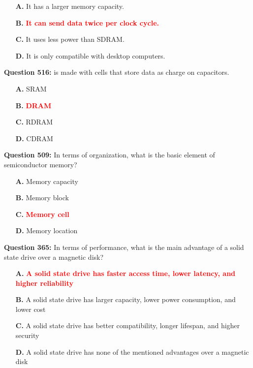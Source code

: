 \documentclass[12pt,a4paper]{article}
\begin{document}
\begin{itemize}
    \item[\textbf{A.}] It has a larger memory capacity.
    \item[\textbf{B.}] \textcolor{red}{\textbf{It can send data twice per clock cycle.}}
    \item[\textbf{C.}] It uses less power than SDRAM.
    \item[\textbf{D.}] It is only compatible with desktop computers.
\end{itemize}

\vspace{0.5cm}

\vspace{0.5cm}

\textbf{Question 516:} \underline{\hspace{1.5cm}} is made with cells that store data as charge on capacitors.

\begin{itemize}
    \item[\textbf{A.}] SRAM
    \item[\textbf{B.}] \textcolor{red}{\textbf{DRAM}}
    \item[\textbf{C.}] RDRAM
    \item[\textbf{D.}] CDRAM
\end{itemize}

\vspace{0.5cm}

\vspace{0.5cm}

\textbf{Question 509:} In terms of organization, what is the basic element of semiconductor memory?

\begin{itemize}
    \item[\textbf{A.}] Memory capacity
    \item[\textbf{B.}] Memory block
    \item[\textbf{C.}] \textcolor{red}{\textbf{Memory cell}}
    \item[\textbf{D.}] Memory location
\end{itemize}

\vspace{0.5cm}

\vspace{0.5cm}

\textbf{Question 365:} In terms of performance, what is the main advantage of a solid state drive over a magnetic disk?

\begin{itemize}
    \item[\textbf{A.}] \textcolor{red}{\textbf{A solid state drive has faster access time, lower latency, and higher reliability}}
    \item[\textbf{B.}] A solid state drive has larger capacity, lower power consumption, and lower cost
    \item[\textbf{C.}] A solid state drive has better compatibility, longer lifespan, and higher security
    \item[\textbf{D.}] A solid state drive has none of the mentioned advantages over a magnetic disk
\end{itemize}
\end{document}
